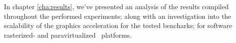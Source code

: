 In chapter \ref{cha:results}, we've presented an analysis of the results compiled throughout the performed experiments; along with an investigation into the scalability of the graphics acceleration for the tested bencharks; for software rasterized- and paravirtualized \dvttermsimics\ platforms.


